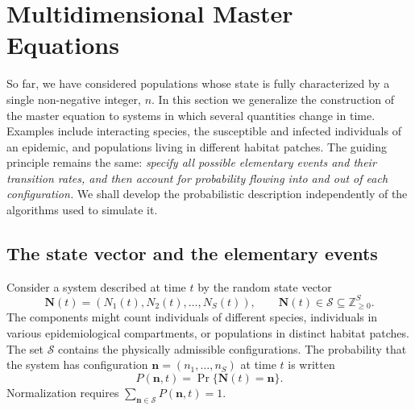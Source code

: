 \section{Multidimensional Master Equations}
\label{sec:multidimensional-master}

So far, we have considered populations whose state is fully characterized by a
single non-negative integer, $n$. In this section we generalize the
construction of the master equation to systems in which several quantities
change in time. Examples include interacting species, the susceptible and
infected individuals of an epidemic, and populations living in different
habitat patches. The guiding principle remains the same: \emph{specify all
possible elementary events and their transition rates, and then account for
probability flowing into and out of each configuration.} We shall develop the
probabilistic description independently of the algorithms used to simulate it.

\subsection{The state vector and the elementary events}
\label{subsec:multi-events}

Consider a system described at time $t$ by the random state vector
\begin{equation}
    \mathbf{N}(t)=(N_1(t),N_2(t),\ldots,N_S(t)),
    \qquad \mathbf{N}(t)\in\mathcal S\subseteq\mathbb{Z}_{\geq 0}^{S}.
    \label{eq:multi-state}
\end{equation}
The components might count individuals of different species, individuals in
various epidemiological compartments, or populations in distinct habitat
patches. The set $\mathcal S$ contains the physically admissible
configurations. The probability that the system has configuration
$\mathbf n=(n_1,\ldots,n_S)$ at time $t$ is written
\begin{equation}
    P(\mathbf n,t)=\Pr\{\mathbf N(t)=\mathbf n\}.
\end{equation}
Normalization requires $\sum_{\mathbf n\in\mathcal S}P(\mathbf n,t)=1$.

